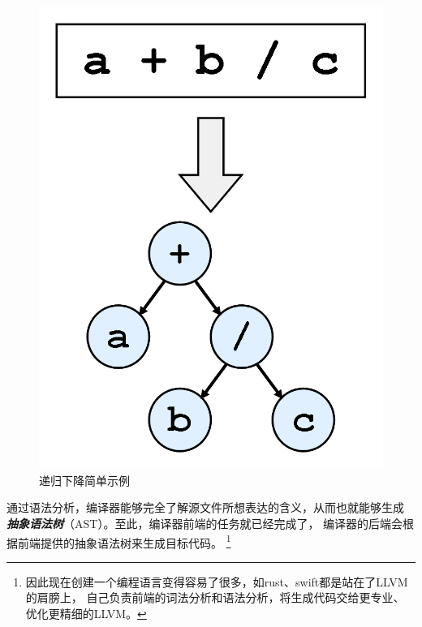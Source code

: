 \begin{figure}[hbt]
  \centering
  \includegraphics[scale=.4]{recursive-decent.png}
  \caption{递归下降简单示例}\label{fig:recursive-decent}
\end{figure}

通过语法分析，编译器能够完全了解源文件所想表达的含义，从而也就能够生成
{\bf\it 抽象语法树}（AST）。至此，编译器前端的任务就已经完成了，
编译器的后端会根据前端提供的抽象语法树来生成目标代码。
\footnote{因此现在创建一个编程语言变得容易了很多，如rust、swift都是站在了LLVM的肩膀上，
自己负责前端的词法分析和语法分析，将生成代码交给更专业、优化更精细的LLVM。}
